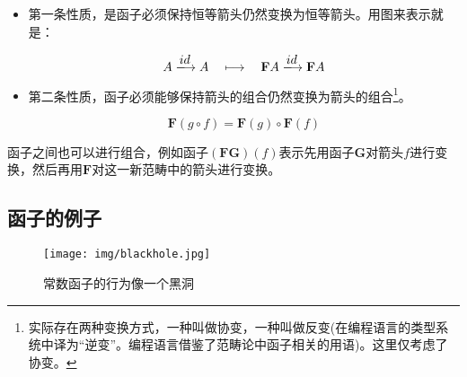 \documentclass{article}
\begin{document}
\begin{itemize}
\item 第一条性质，是函子必须保持恒等箭头仍然变换为恒等箭头。用图来表示就是：

\[
A \arrowto{id} A \quad \longmapsto \quad \mathbf{F}A \arrowto{id} \mathbf{F}A
\]

 
\item 第二条性质，函子必须能够保持箭头的组合仍然变换为箭头的组合\footnote{实际存在两种变换方式，一种叫做协变，一种叫做反变(在编程语言的类型系统中译为“逆变”。编程语言借鉴了范畴论中函子相关的用语)。这里仅考虑了协变。}。

\begin{center}
\end{center}

\[
\mathbf{F}(g \circ f) = \mathbf{F}(g) \circ \mathbf{F}(f)
\]
\end{itemize}

函子之间也可以进行组合，例如函子$(\mathbf{F} \mathbf{G})(f)$表示先用函子$\mathbf{G}$对箭头$f$进行变换，然后再用$\mathbf{F}$对这一新范畴中的箭头进行变换。

\subsection{函子的例子}
\label{sec:functor:examples}

\begin{figure}[htbp]
 \centering
 \texttt{[image: img/blackhole.jpg]}
 \captionsetup{labelformat=empty}
 \caption{常数函子的行为像一个黑洞}
 \label{fig:blackhole}
\end{figure}
\end{document}

